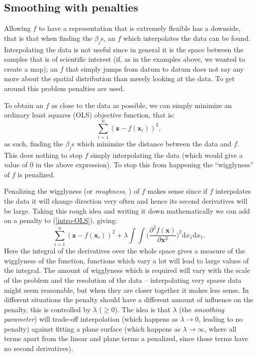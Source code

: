 \subsection{Smoothing with penalties}
\label{GAMpenalties}

Allowing $f$ to have a representation that is extremely flexible has a downside, that is that when finding the $\beta_j$s, an $f$ which interpolates the data can be found. Interpolating the data is not useful since in general it is the space between the samples that is of scientific interest (if, as in the examples above, we wanted to create a map); an $f$ that simply jumps from datum to datum does not say any more about the spatial distribution than merely looking at the data. To get around this problem penalties are used.

To obtain an $f$ as close to the data as possible, we can simply minimize an ordinary least squares (OLS) objective function, that is:
\begin{equation}
\sum_{i=1}^n (\bm{z} - f(\mathbf{x}_i))^2,
\label{intro-OLS}
\end{equation}
as such, finding the $\beta_j$s which minimize the distance between the data and $f$. This does nothing to stop $f$ simply interpolating the data (which would give a value of 0 in the above expression). To stop this from happening the ``wigglyness'' of $f$ is penalized.

Penalizing the wigglyness (or \textit{roughness}, \cite{rwc}) of $f$ makes sense since if $f$ interpolates the data it will change direction very often and hence its second derivatives will be large. Taking this rough idea and writing it down mathematically we can add on a penalty to (\ref{intro-OLS}), giving:
\begin{equation}
\sum_{i=1}^n (\bm{z} - f(\mathbf{x}_i))^2 +  \lambda \int\int \Big(\frac{\partial^2 f(\mathbf{x})}{\partial \mathbf{x}^2}\Big)^2 \text{d}x_1\text{d}x_1.
\label{intro-2d-objfcn}
\end{equation}
Here the integral of the derivatives over the whole space gives a measure of the wigglyness of the function, functions which vary a lot will lead to large values of the integral. The amount of wigglyness which is required will vary with the scale of the problem and the resolution of the data -- interpolating very sparse data might seem reasonable, but when they are closer together it makes less sense. In different situations the penalty should have a different amount of influence on the penalty, this is controlled by $\lambda$ ($\geq0$). The idea is that $\lambda$ (the \textit{smoothing parameter}) will trade-off interpolation (which happens as $\lambda \rightarrow 0$, leading to no penalty) against fitting a plane surface (which happens as $\lambda \rightarrow \infty$, where all terms apart from the linear and plane terms a penalized, since those terms have no second derivatives).


